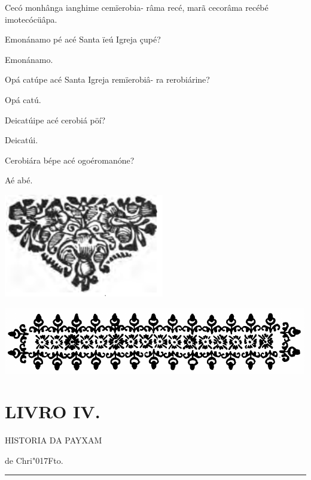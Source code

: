 \documentclass[openany,titlepage,12pt]{book}
\newcommand{\lgS}{\char"017F}
\begin{document}
\begin{alternate}
    \item Cecó monhânga ianghime cemïerobia-
    râma recé, marã cecorâma recébé imotecócüâpa.
    \item Emonánamo pé acé Santa ïeú Igreja\linebreak
    çupé?
    \item Emonánamo.
    \item Opá catúpe acé Santa Igreja remïerobiâ-
    ra rerobiárine?
    \item Opá catú.
    \item Deicatúipe acé cerobiá pöí?
    \item Deicatúi.
    \item Cerobiára bépe acé ogoéromanóne?
    \item Aé abé.
  
\end{alternate}

\begin{center}
    \vspace*{20pt}
    \includegraphics[scale=0.66]{13.livro3_fim.png}
\end{center}
\newpage

\begin{center}
    \vspace*{20pt}
    \includegraphics[scale=0.33]{12.livro3.png}
\end{center}
\unskip
\vspace{-30pt}
{\let\clearpage\relax \chapter{\Huge LIVRO IV.}}
\unskip
\vspace{-2pt}
\begin{center}
    {\large HISTORIA DA PAYXAM}
\end{center}
\unskip
\begin{center}
    de Chri\lgS to.
\end{center}
\unskip
\par\noindent\rule{\textwidth}{0.4pt}
\unskip\vspace{-3pt}
\end{document}
